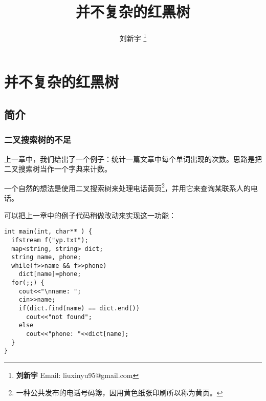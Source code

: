\documentclass[UTF8]{article}
\begin{document}


\title{并不复杂的红黑树}

\author{刘新宇
\thanks{{\bfseries 刘新宇} \newline
  Email: liuxinyu95@gmail.com \newline}
  }

\maketitle
\fi


\ifx\wholebook\relax
\chapter{并不复杂的红黑树}
\fi

\section{简介}
\label{introduction} 

\subsection{二叉搜索树的不足}
上一章中，我们给出了一个例子：统计一篇文章中每个单词出现的次数。思路是把二叉搜索树当作一个字典来计数。

一个自然的想法是使用二叉搜索树来处理电话黄页\footnote{一种公共发布的电话号码簿，因用黄色纸张印刷所以称为黄页。}，并用它来查询某联系人的电话。

可以把上一章中的例子代码稍做改动来实现这一功能：

\begin{lstlisting}
int main(int, char** ) {
  ifstream f("yp.txt");
  map<string, string> dict;
  string name, phone;
  while(f>>name && f>>phone)
    dict[name]=phone;
  for(;;) {
    cout<<"\nname: ";
    cin>>name;
    if(dict.find(name) == dict.end())
      cout<<"not found";
    else
      cout<<"phone: "<<dict[name];
  }
}
\end{lstlisting}
\end{document}

